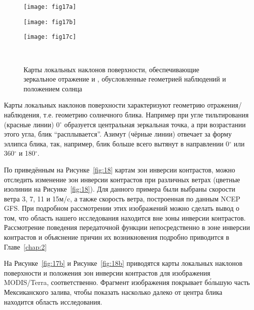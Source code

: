\begin{figure}[H]
    	\centering
	\begin{minipage}{.33\textwidth}
	    \subcaptionbox{\label{fig:17a}}
		{\texttt{[image: fig17a]}}
	\end{minipage}
	\hfill
	\begin{minipage}{.31\textwidth}
	    \subcaptionbox{\label{fig:17b}}
		{\texttt{[image: fig17b]}}
	\end{minipage}
	\hfill
	\begin{minipage}{.31\textwidth}
	    \subcaptionbox{\label{fig:17c}}
		{\texttt{[image: fig17c]}}
	\end{minipage}
	\\
    \caption{Карты локальных наклонов поверхности, обеспечивающие зеркальное отражение и , обусловленные геометрией наблюдений и положением солнца}
    \label{fig:17}
\end{figure}


Карты локальных наклонов поверхности характеризуют геометрию отражения/наблюдения, т.е. геометрию солнечного блика. Например при угле тильтирования (красные линии) 0${}^\circ{}$ образуется центральная зеркальная точка, а при возрастании этого угла, блик ``расплывается''. Азимут (чёрные линии) отвечает за форму эллипса блика, так, например, блик больше всего вытянут в направлении 0${}^\circ{}$ или 360${}^\circ{}$ и 180${}^\circ{}$.

По приведённым на Рисунке~\ref{fig:18} картам зон инверсии контрастов, можно отследить изменение зон инверсии контрастов при различных ветрах (цветные изолинии на Рисунке~\ref{fig:18}). Для данного примера были выбраны скорости ветра 3, 7, 11 и 15м/c, а также скорость ветра, построенная по данным NCEP GFS. При подробном рассмотрении этих изображений можно сделать вывод о том, что область нашего исследования находится вне зоны инверсии контрастов. Рассмотрение поведения передаточной функции непосредственно в зоне инверсии контрастов и объяснение причин их возникновения подробно приводится в Главе~\ref{chap:2}

На Рисунке~\ref{fig:17b} и Рисунке~\ref{fig:18b} приводятся карты локальных наклонов поверхности и положения зон инверсии контрастов для изображения MODIS/Terra, соответственно. Фрагмент изображения покрывает б\'{о}льшую часть Мексиканского залива, чтобы показать насколько далеко от центра блика находится область исследования.



